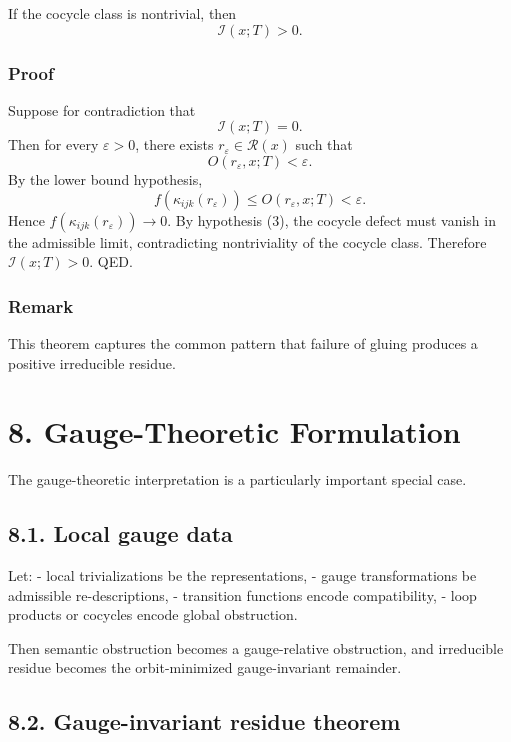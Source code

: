 \documentclass[
]{article}
\begin{document}
If the cocycle class is nontrivial, then \[
\mathcal{I}(x;T) > 0.
\]

\subsubsection{Proof}\label{proof-5}

Suppose for contradiction that \[
\mathcal{I}(x;T)=0.
\] Then for every \(\varepsilon > 0\), there exists
\(r_\varepsilon \in \mathcal{R}(x)\) such that \[
O(r_\varepsilon,x;T) < \varepsilon.
\] By the lower bound hypothesis, \[
f(\kappa_{ijk}(r_\varepsilon)) \le O(r_\varepsilon,x;T) < \varepsilon.
\] Hence \(f(\kappa_{ijk}(r_\varepsilon)) \to 0\). By hypothesis (3),
the cocycle defect must vanish in the admissible limit, contradicting
nontriviality of the cocycle class. Therefore \(\mathcal{I}(x;T) > 0\).
QED.

\subsubsection{Remark}\label{remark-1}

This theorem captures the common pattern that failure of gluing produces
a positive irreducible residue.

\section{8. Gauge-Theoretic
Formulation}\label{gauge-theoretic-formulation}

The gauge-theoretic interpretation is a particularly important special
case.

\subsection{8.1. Local gauge data}\label{local-gauge-data}

Let: - local trivializations be the representations, - gauge
transformations be admissible re-descriptions, - transition functions
encode compatibility, - loop products or cocycles encode global
obstruction.

Then semantic obstruction becomes a gauge-relative obstruction, and
irreducible residue becomes the orbit-minimized gauge-invariant
remainder.

\subsection{8.2. Gauge-invariant residue
theorem}\label{gauge-invariant-residue-theorem}
\end{document}
